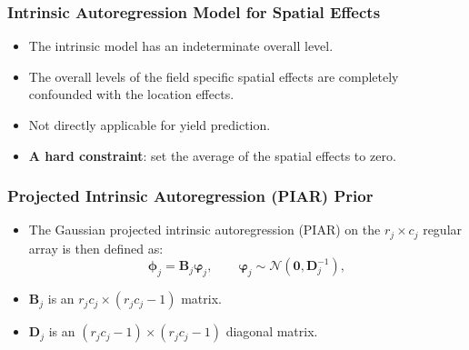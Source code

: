 \documentclass{beamer}
\newcommand{\bB}{\mathbf{B}}
\newcommand{\bD}{\mathbf{D}}
\newcommand{\bphi}{{\bm\phi}}
\newcommand{\bvarphi}{{\bm\varphi}}
\begin{document}
\begin{frame}
	\frametitle{Intrinsic Autoregression Model for Spatial Effects}
	\begin{itemize}

\item The intrinsic model has an indeterminate overall level.
\item The overall levels of the field specific spatial effects are completely confounded with the location effects.
\item Not directly applicable for yield prediction.
\item  \textbf{A hard constraint}:  set the average of the spatial effects to zero.
\end{itemize}
 
\end{frame}




\begin{frame}
	\frametitle{Projected Intrinsic Autoregression (PIAR) Prior}

  	\begin{itemize}
	\item The Gaussian projected intrinsic autoregression (PIAR) on the $r_j \times c_j$ regular array is then defined as:
	\begin{equation*}
\bphi_j = \bB_j \bvarphi_j,\qquad \bvarphi_j\sim{\mathcal N}(\mathbf{0},\bD_j^{-1}),
\end{equation*}
\item  $\bB_{j}$ is an $r_jc_j \times (r_jc_j-1)$ matrix.
\item $\bD_j$ is an $(r_jc_j-1) \times (r_jc_j-1)$ diagonal matrix. 
	\end{itemize}
	
\end{frame}
\end{document}
